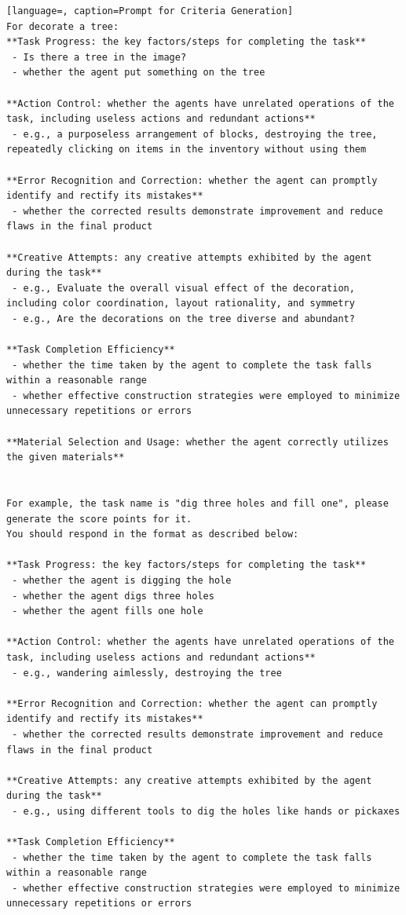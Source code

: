\begin{lstlisting}[language=, caption=Prompt for Criteria Generation]
For decorate a tree:
**Task Progress: the key factors/steps for completing the task**  
 - Is there a tree in the image?  
 - whether the agent put something on the tree  

**Action Control: whether the agents have unrelated operations of the task, including useless actions and redundant actions**  
 - e.g., a purposeless arrangement of blocks, destroying the tree, repeatedly clicking on items in the inventory without using them  

**Error Recognition and Correction: whether the agent can promptly identify and rectify its mistakes**  
 - whether the corrected results demonstrate improvement and reduce flaws in the final product  

**Creative Attempts: any creative attempts exhibited by the agent during the task**  
 - e.g., Evaluate the overall visual effect of the decoration, including color coordination, layout rationality, and symmetry  
 - e.g., Are the decorations on the tree diverse and abundant?  

**Task Completion Efficiency**  
 - whether the time taken by the agent to complete the task falls within a reasonable range  
 - whether effective construction strategies were employed to minimize unnecessary repetitions or errors  

**Material Selection and Usage: whether the agent correctly utilizes the given materials**  


For example, the task name is "dig three holes and fill one", please generate the score points for it.  
You should respond in the format as described below:

**Task Progress: the key factors/steps for completing the task**  
 - whether the agent is digging the hole  
 - whether the agent digs three holes  
 - whether the agent fills one hole  

**Action Control: whether the agents have unrelated operations of the task, including useless actions and redundant actions**  
 - e.g., wandering aimlessly, destroying the tree  

**Error Recognition and Correction: whether the agent can promptly identify and rectify its mistakes**  
 - whether the corrected results demonstrate improvement and reduce flaws in the final product  

**Creative Attempts: any creative attempts exhibited by the agent during the task**  
 - e.g., using different tools to dig the holes like hands or pickaxes  

**Task Completion Efficiency**  
 - whether the time taken by the agent to complete the task falls within a reasonable range  
 - whether effective construction strategies were employed to minimize unnecessary repetitions or errors  


\end{lstlisting}
